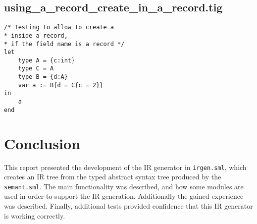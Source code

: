 \documentclass{article}
\begin{document}
\subsection{using\_a\_record\_create\_in\_a\_record.tig}

\begin{lstlisting}[frame=single]
/* Testing to allow to create a
* inside a record,
* if the field name is a record */
let
	type A = {c:int}
	type C = A
	type B = {d:A}
	var a := B{d = C{c = 2}}
in
	a
end
\end{lstlisting}


\section{Conclusion}
This report presented the development of the IR generator in \texttt{irgen.sml}, which creates an IR tree from the typed abstract syntax tree produced by the \texttt{semant.sml}. The main functionality was described, and how some modules are used in order to support the IR generation. Additionally the gained experience was described. Finally, additional tests provided confidence that this IR generator is working correctly.
\end{document}
